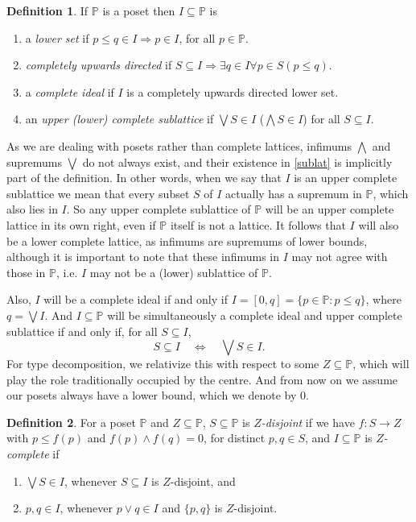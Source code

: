 \documentclass{amsart}
\theoremstyle{definition}
\newtheorem{dfn}[dfn]{Definition}
\numberwithin{equation}{section}
\begin{document}
\begin{dfn}
If $\mathbb{P}$ is a poset then $I\subseteq\mathbb{P}$ is
\begin{enumerate}
\item a \emph{lower set} if $p\leq q\in I\Rightarrow p\in I$, for all $p\in\mathbb{P}$.
\item \emph{completely upwards directed} if $S\subseteq I\Rightarrow\exists q\in I\forall p\in S(p\leq q)$.
\item a \emph{complete ideal} if $I$ is a completely upwards directed lower set.
\item\label{sublat} an \emph{upper (lower) complete sublattice} if $\bigvee S\in I$ ($\bigwedge S\in I$) for all $S\subseteq I$.
\end{enumerate}
\end{dfn}
As we are dealing with posets rather than complete lattices, infimums $\bigwedge$ and supremums $\bigvee$ do not always exist, and their existence in \eqref{sublat} is implicitly part of the definition.  In other words, when we say that $I$ is an upper complete sublattice we mean that every subset $S$ of $I$ actually has a supremum in $\mathbb{P}$, which also lies in $I$.  So any upper complete sublattice of $\mathbb{P}$ will be an upper complete lattice in its own right, even if $\mathbb{P}$ itself is not a lattice.  It follows that $I$ will also be a lower complete lattice, as infimums are supremums of lower bounds, although it is important to note that these infimums in $I$ may not agree with those in $\mathbb{P}$, i.e. $I$ may not be a (lower) sublattice of $\mathbb{P}$.

Also, $I$ will be a complete ideal if and only if $I=[0,q]=\{p\in\mathbb{P}:p\leq q\}$, where $q=\bigvee I$.  And $I\subseteq\mathbb{P}$ will be simultaneously a complete ideal and upper complete sublattice if and only if, for all $S\subseteq I$, \[S\subseteq I\quad\Leftrightarrow\quad\bigvee S\in I.\]  For type decomposition, we relativize this with respect to some $Z\subseteq\mathbb{P}$, which will play the role traditionally occupied by the centre.  And from now on we assume our posets always have a lower bound, which we denote by $0$.

\begin{dfn}\label{compdef}
For a poset $\mathbb{P}$ and $Z\subseteq\mathbb{P}$, $S\subseteq\mathbb{P}$ is \emph{$Z$-disjoint} if we have $f:S\rightarrow Z$ with $p\leq f(p)$ and $f(p)\wedge f(q)=0$, for distinct $p,q\in S$, and $I\subseteq\mathbb{P}$ is \emph{$Z$-complete} if
\begin{enumerate}
\item\label{compdef1} $\bigvee S\in I$, whenever $S\subseteq I$ is $Z$-disjoint, and
\item\label{compdef2} $p,q\in I$, whenever $p\vee q\in I$ and $\{p,q\}$ is $Z$-disjoint.
\end{enumerate}
\end{dfn}
\end{document}
